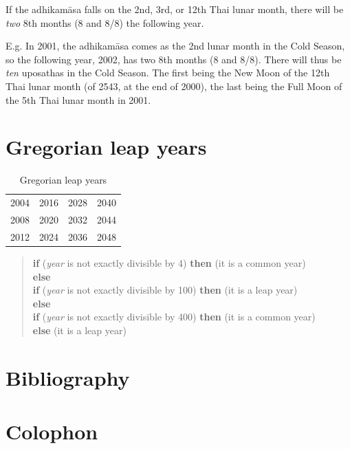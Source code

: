 \documentclass[11pt,oneside]{memoir-article}
\begin{document}
If the adhikamāsa falls on the 2nd, 3rd, or 12th Thai lunar month,
there will be \emph{two} 8th months (8 and 8/8) the following year.

E.g. In 2001, the adhikamāsa comes as the 2nd lunar month in the Cold Season, so
the following year, 2002, has two 8th months (8 and 8/8). There will thus be
\emph{ten} uposathas in the Cold Season. The first being the New Moon of the 12th
Thai lunar month (of 2543, at the end of 2000), the last being the Full Moon
of the 5th Thai lunar month in 2001.

\clearpage
\chapter{Gregorian leap years}
\label{sec-5}

\begin{table}[h]
\caption{\label{tbl-cycle-leap-years} Gregorian leap years}
\centering
\begin{tabular}{rrrr}
2004 & 2016 & 2028 & 2040\\
2008 & 2020 & 2032 & 2044\\
2012 & 2024 & 2036 & 2048\\
\end{tabular}
\end{table}

\begin{quote}
\textbf{if} (\emph{year} is not exactly divisible by 4) \textbf{then} (it is a common year)\\
\textbf{else}\\
\textbf{if} (\emph{year} is not exactly divisible by 100) \textbf{then} (it is a leap year)\\
\textbf{else}\\
\textbf{if} (\emph{year} is not exactly divisible by 400) \textbf{then} (it is a common year)\\
\textbf{else} (it is a leap year)
\cite{wp-leap-year}
\end{quote}

\backmatter

\chapter{Bibliography}
\label{sec-6}
\label{bibliography}



\chapter{Colophon}
\label{sec-7}
\end{document}
